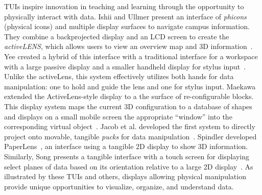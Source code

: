 \documentclass[review]{vgtc}                 %
\begin{document}
TUIs inspire innovation in teaching and learning 
through the opportunity to physically interact with data.
%
Ishii and Ullmer present an interface of {\em phicons} (physical
icons) and multiple display surfaces to navigate campus information.
They combine a backprojected display and an LCD screen to create the
{\em activeLENS}, which allows users to view an overview map and 3D
information~\cite{Ishii97tangiblebits:}.
%
Yee created a hybrid of this interface with a traditional interface
for a workspace with a large passive 
display and a smaller handheld display for 
stylus input~\cite{642613}.  Unlike the activeLens, this system
effectively utilizes both hands for data manipulation: one to hold and
guide the lens and one for stylus input.  Maekawa
extended the 
ActiveLens-style display to
a the surface of re-configurable blocks.  This display system maps the
current 3D configuration to a database of shapes
and displays on a small mobile screen the appropriate ``window'' into
the corresponding virtual object~\cite{1517704}.  Jacob et
al. developed the first system to directly project onto movable,
tangible {\em pucks} for data manipulation~\cite{Jacob01atangible}.
Spindler developed PaperLens~\cite{Spindler:2009:PAM:1731903.1731920},
an interface using a tangible 2D display to show 3D information.
Similarly, Song presents a tangible interface with a touch screen for
displaying
select planes of data based on its orientation relative to a large 2D
display~\cite{Song:2011:WEA:1978942.1979140}.
%
As illustrated by these TUIs and others, displays allowing physical
manipulation provide unique opportunities to visualize, organize,
and understand data.
\end{document}
